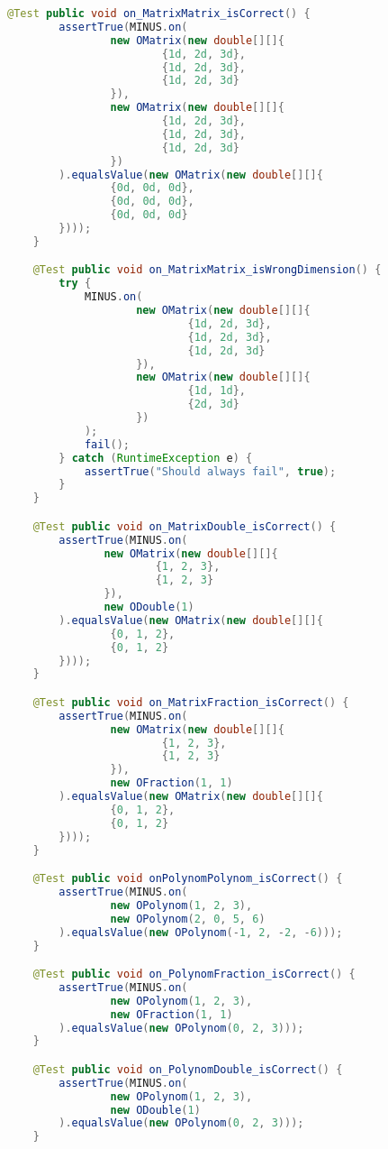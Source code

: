 \begin{lstlisting}[caption=MinusTest (Schwenke),label=list:MinusTest,language=Java]
    @Test public void on_MatrixMatrix_isCorrect() {
        assertTrue(MINUS.on(
                new OMatrix(new double[][]{
                        {1d, 2d, 3d},
                        {1d, 2d, 3d},
                        {1d, 2d, 3d}
                }),
                new OMatrix(new double[][]{
                        {1d, 2d, 3d},
                        {1d, 2d, 3d},
                        {1d, 2d, 3d}
                })
        ).equalsValue(new OMatrix(new double[][]{
                {0d, 0d, 0d},
                {0d, 0d, 0d},
                {0d, 0d, 0d}
        })));
    }

    @Test public void on_MatrixMatrix_isWrongDimension() {
        try {
            MINUS.on(
                    new OMatrix(new double[][]{
                            {1d, 2d, 3d},
                            {1d, 2d, 3d},
                            {1d, 2d, 3d}
                    }),
                    new OMatrix(new double[][]{
                            {1d, 1d},
                            {2d, 3d}
                    })
            );
            fail();
        } catch (RuntimeException e) {
            assertTrue("Should always fail", true);
        }
    }

    @Test public void on_MatrixDouble_isCorrect() {
        assertTrue(MINUS.on(
               new OMatrix(new double[][]{
                       {1, 2, 3},
                       {1, 2, 3}
               }),
               new ODouble(1)
        ).equalsValue(new OMatrix(new double[][]{
                {0, 1, 2},
                {0, 1, 2}
        })));
    }

    @Test public void on_MatrixFraction_isCorrect() {
        assertTrue(MINUS.on(
                new OMatrix(new double[][]{
                        {1, 2, 3},
                        {1, 2, 3}
                }),
                new OFraction(1, 1)
        ).equalsValue(new OMatrix(new double[][]{
                {0, 1, 2},
                {0, 1, 2}
        })));
    }

    @Test public void onPolynomPolynom_isCorrect() {
        assertTrue(MINUS.on(
                new OPolynom(1, 2, 3),
                new OPolynom(2, 0, 5, 6)
        ).equalsValue(new OPolynom(-1, 2, -2, -6)));
    }

    @Test public void on_PolynomFraction_isCorrect() {
        assertTrue(MINUS.on(
                new OPolynom(1, 2, 3),
                new OFraction(1, 1)
        ).equalsValue(new OPolynom(0, 2, 3)));
    }

    @Test public void on_PolynomDouble_isCorrect() {
        assertTrue(MINUS.on(
                new OPolynom(1, 2, 3),
                new ODouble(1)
        ).equalsValue(new OPolynom(0, 2, 3)));
    }


\end{lstlisting}
